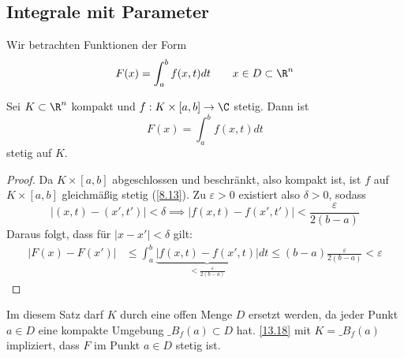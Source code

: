 \documentclass[a4paper,10pt]{scrartcl}
\begin{document}
\subsection{Integrale mit Parameter}

Wir betrachten Funktionen der Form
\[
F(x) = \int_a^bf(x,t)dt \qquad x\in D\subset \R^n
\]

\begin{st}
\label{13.18}
Sei $K\subset \R^n$ kompakt und $f:K\times [a,b]\to \C$ stetig.
Dann ist
\[
F(x) = \int_a^bf(x,t)dt
\]
stetig auf $K$.

\begin{proof}
Da $K\times[a,b]$ abgeschlossen und beschränkt, also kompakt ist, ist $f$ auf $K\times [a,b]$ gleichmäßig stetig (\ref{8.13}).
Zu $\varepsilon>0$ existiert also $\delta>0$, sodass
\[
|(x,t)-(x',t')| < \delta \implies |f(x,t)-f(x',t')| < \frac \varepsilon {2(b-a)}
\]
Daraus folgt, dass für $|x-x'| < \delta$ gilt:
\begin{align*}
|F(x)-F(x')| &\le \int_a^b\underbrace{|f(x,t)-f(x',t)|}_{< \frac \varepsilon{2(b-a)}} dt
\le (b-a)\frac \varepsilon{2(b-a)} < \varepsilon
\end{align*}
\end{proof}

\begin{note}
Im diesem Satz darf $K$ durch eine offen Menge $D$ ersetzt werden, da jeder Punkt $a\in D$ eine kompakte Umgebung $\_{B_f(a)}\subset D$ hat.
\ref{13.18} mit $K=\_{B_f(a)}$ impliziert, dass $F$ im Punkt $a\in D$ stetig ist. 
\end{note}
\end{st}
\end{document}
